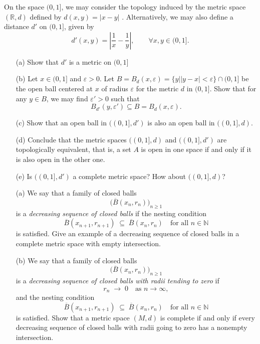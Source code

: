 \begin{problem}
    On the space $(0,1]$, we may consider the topology induced by the metric space $(\mathbb{R},d)$ defined by
$d(x,y)=|x-y|$ . Alternatively, we may also define a distance $d'$ on $(0,1]$, given by
\[
d'(x,y) = \left| \frac{1}{x} - \frac{1}{y} \right|, \qquad \forall x,y \in (0,1].
\]

\begin{enumerate}
 \item[(a)] Show that $d'$ is a metric on $(0,1]$
 \item[(b)] Let $x \in (0,1]$ and $\varepsilon>0$. Let $B = B_{d}(x,\varepsilon)=\{y | |y-x| < \varepsilon \} \cap (0,1]$  be the open ball centered at $x$ of radius $\varepsilon$ for the metric $d$ in $(0,1]$.  
  Show that for any $y \in B$, we may find $\varepsilon'>0$ such that
  \[
  B_{d'}(y,\varepsilon') \subseteq B = B_{d}(x,\varepsilon).
  \]

 \item[(c)]Show that an open ball in $((0,1],d')$ is also an open ball in $((0,1],d)$.

 \item[(d)] Conclude that the metric spaces $((0,1],d)$ and $((0,1],d')$ are topologically equivalent, that is, a set $A$ is open in one space if and only if it is also open in the other one.

 \item[(e)] Is $((0,1],d')$ a complete metric space? How about $((0,1],d)$?
\end{enumerate}
\end{problem}

\begin{problem}
    \begin{enumerate}

  \item[(a)] 
  We say that a family of closed balls 
\[
\bigl(\overline{B}(x_n,r_n)\bigr)_{n\ge 1}
\]
is a \emph{decreasing sequence of closed balls} if 
the nesting condition
\[
\overline{B}(x_{n+1},r_{n+1}) \;\subseteq\; \overline{B}(x_n,r_n)
\quad\text{for all } n\in\mathbb{N}
\]
is satisfied. Give an example of a decreasing sequence of closed balls in a complete metric space with empty intersection. 

  \item[(b)]  We say that a family of closed balls 
\[
\bigl(\overline{B}(x_n,r_n)\bigr)_{n\ge 1}
\]
is a \emph{decreasing sequence of closed balls with radii tending to zero} if 
\[
r_n \;\to\; 0 \quad\text{as } n\to\infty,
\]
and the nesting condition
\[
\overline{B}(x_{n+1},r_{n+1}) \;\subseteq\; \overline{B}(x_n,r_n)
\quad\text{for all } n\in\mathbb{N}
\]
is satisfied.
  Show that a metric space $(M,d)$ is complete if and only if every decreasing sequence of closed balls with radii going to zero has a nonempty intersection. \end{enumerate}
\end{problem}
